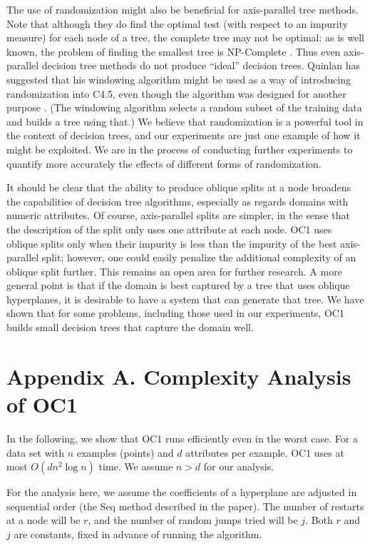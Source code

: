 The use of randomization might also be beneficial for axis-parallel
tree methods.  Note that although they do find the optimal test (with
respect to an impurity measure) for each node of a tree, the
complete tree may not be optimal: as is well known, the problem of
finding the smallest tree is NP-Complete \cite{hyafil/rivest/76}.
Thus even axis-parallel decision tree methods do not produce ``ideal''
decision trees.  Quinlan has suggested that his windowing algorithm
might be used as a way of introducing randomization into C4.5, even
though the algorithm was designed for another purpose
\cite{quinlan/93}.  (The windowing algorithm selects a 
random subset of the training data and builds a tree using that.)  We
believe that randomization is a powerful tool in the context of
decision trees, and our experiments are just one example of how it
might be exploited.  We are in the process of conducting further
experiments to quantify more accurately the effects of different forms
of randomization.

It should be clear that the ability to produce oblique splits at a
node broadens the capabilities of decision tree algorithms, especially
as regards domains with numeric attributes.  Of course, axis-parallel
splits are simpler, in the sense that the description of the split
only uses one attribute at each node.  OC1 uses oblique splits only
when their impurity is less than the impurity of the best
axis-parallel split; however, one could easily penalize the additional
complexity of an oblique split further.  This remains an open area for
further research.  A more general point is that if the domain is best
captured by a tree that uses oblique hyperplanes, it is desirable to
have a system that can generate that tree.  We have shown that for
some problems, including those used in our experiments, OC1 builds
small decision trees that capture the domain well.

\appendix
\section*{Appendix A. Complexity Analysis of OC1}
\label{appendix:1}

In the following, we show that OC1 runs efficiently even in the worst
case.  For a data set with $n$ examples (points) and $d$ attributes
per example, OC1 uses at most $O(dn^2 \log n)$ time.  We assume $n >
d$ for our analysis.

For the analysis here, we assume the coefficients of a hyperplane are
adjusted in sequential order (the Seq method described in the paper).
The number of restarts at a node will be $r$, and the number of random
jumps tried will be $j$.  Both $r$ and $j$ are constants, fixed in
advance of running the algorithm.

